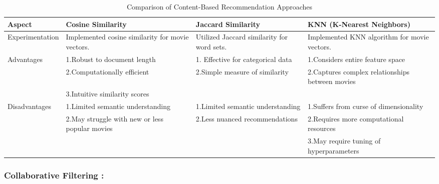 \documentclass[a4paper]{article}
\theoremstyle{plain}
\theoremstyle{definition}
\begin{document}
\begin{table}[htbp]
\centering
\begin{adjustbox}{max width=\textwidth}
\begin{tabular}{|p{3cm}|p{4.5cm}|p{4.5cm}|p{4.5cm}|}
\hline
\rowcolor{gray!20}
\textbf{Aspect} & \textbf{Cosine Similarity} & \textbf{Jaccard Similarity} & \textbf{KNN (K-Nearest Neighbors)} \\
\hline
Experimentation & Implemented cosine similarity for movie vectors. & Utilized Jaccard similarity for word sets. & Implemented KNN algorithm for movie vectors. \\
\hline
Advantages & 1.Robust to document length & 1. Effective for categorical data & 1.Considers entire feature space \\
 & 2.Computationally efficient & 2.Simple measure of similarity & 2.Captures complex relationships between movies \\
 & 3.Intuitive similarity scores &  &  \\
\hline
Disadvantages & 1.Limited semantic understanding & 1.Limited semantic understanding & 1.Suffers from curse of dimensionality \\
 & 2.May struggle with new or less popular movies & 2.Less nuanced recommendations & 2.Requires more computational resources \\
 &  &  & 3.May require tuning of hyperparameters \\
\hline
\end{tabular}
\end{adjustbox}
\caption{Comparison of Content-Based Recommendation Approaches}
\label{tab:comparison}
\end{table}

\newpage
 \subsubsection{Collaborative Filtering : }
 
\end{document}
